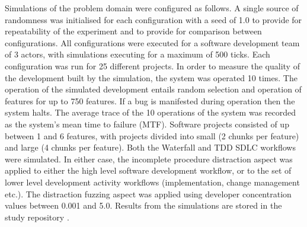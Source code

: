 \documentclass{llncs}
\begin{document}
Simulations of the problem domain were configured as follows.  A single source of randomness was initialised for each
configuration with a seed of 1.0 to provide for repeatability of the experiment and to provide for comparison between
configurations. All configurations were executed for a software development team of 3 actors, with simulations executing
for a maximum of 500 ticks.  Each configuration was run for 25 different projects.  In order to measure the quality of
the development built by the simulation, the system was operated 10 times.  The operation of the simulated development
entails random selection and operation of features for up to 750 features.  If a bug is manifested during operation then
the system halts.  The average trace of the 10 operations of the system was recorded as the system's mean time to
failure (MTF). Software projects consisted of up between 1 and 6 features, with projects divided into small (2 chunks
per feature) and large (4 chunks per feature). Both the Waterfall and TDD SDLC workflows were simulated.  In either
case, the incomplete procedure distraction aspect was applied to either the high level software development workflow, or
to the set of lower level development activity workflows (implementation, change management etc.).  The distraction
fuzzing aspect was applied using developer concentration values between 0.001 and 5.0.  Results from the simulations are
stored in the study repository \citep{storer2016softdev-workflow-scm}.



\end{document}
